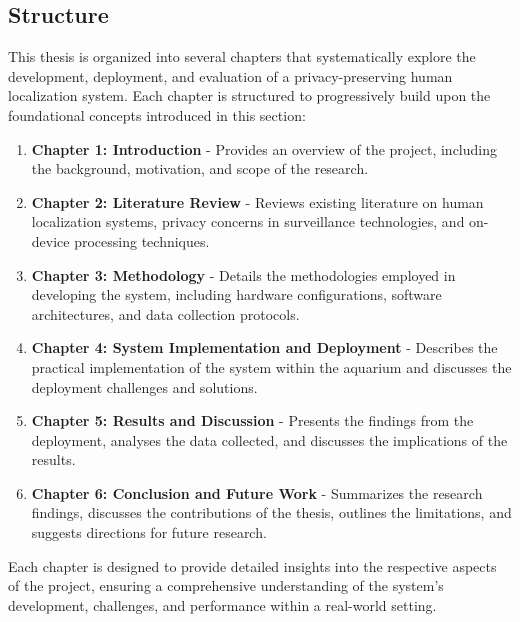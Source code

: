 \subsection{Structure}
\label{sec:structure}
This thesis is organized into several chapters that systematically explore the development, deployment, and evaluation of a privacy-preserving human localization system. Each chapter is structured to progressively build upon the foundational concepts introduced in this section:

\begin{enumerate}
    \item \textbf{Chapter 1: Introduction} - Provides an overview of the project, including the background, motivation, and scope of the research.
    \item \textbf{Chapter 2: Literature Review} - Reviews existing literature on human localization systems, privacy concerns in surveillance technologies, and on-device processing techniques.
    \item \textbf{Chapter 3: Methodology} - Details the methodologies employed in developing the system, including hardware configurations, software architectures, and data collection protocols.
    \item \textbf{Chapter 4: System Implementation and Deployment} - Describes the practical implementation of the system within the aquarium and discusses the deployment challenges and solutions.
    \item \textbf{Chapter 5: Results and Discussion} - Presents the findings from the deployment, analyses the data collected, and discusses the implications of the results.
    \item \textbf{Chapter 6: Conclusion and Future Work} - Summarizes the research findings, discusses the contributions of the thesis, outlines the limitations, and suggests directions for future research.
\end{enumerate}

Each chapter is designed to provide detailed insights into the respective aspects of the project, ensuring a comprehensive understanding of the system's development, challenges, and performance within a real-world setting.
